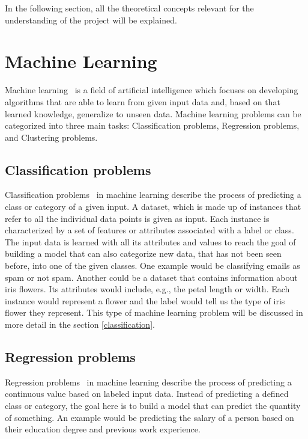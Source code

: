 
In the following section, all the theoretical concepts relevant for the understanding of the project will be explained.

\section{Machine Learning}
Machine learning~\cite{machine_learning} is a field of artificial intelligence which focuses on developing algorithms that are able to learn from given input data and, based on that learned knowledge, generalize to unseen data. Machine learning problems can be categorized into three main tasks: Classification problems, Regression problems, and Clustering problems.

\subsection{Classification problems} \label{classification_problems}
Classification problems~\cite{classification_regression} in machine learning describe the process of predicting a class or category of a given input. A dataset, which is made up of instances that refer to all the individual data points is given as input. Each instance is characterized by a set of features or attributes associated with a label or class. The input data is learned with all its attributes and values to reach the goal of building a model that can also categorize new data, that has not been seen before, into one of the given classes. One example would be classifying emails as spam or not spam. Another could be a dataset that contains information about iris flowers. Its attributes would include, e.g., the petal length or width. Each instance would represent a flower and the label would tell us the type of iris flower they represent. This type of machine learning problem will be discussed in more detail in the section \ref{classification}.

\subsection{Regression problems}
Regression problems~\cite{classification_regression} in machine learning describe the process of predicting a continuous value based on labeled input data. Instead of predicting a defined class or category, the goal here is to build a model that can predict the quantity of something. An example would be predicting the salary of a person based on their education degree and previous work experience.

